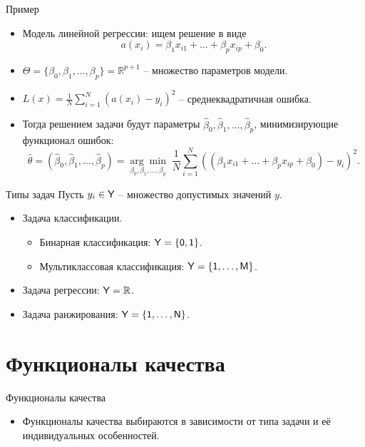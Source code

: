 \documentclass[9pt]{beamer}
\begin{document}
\begin{frame}{Пример}
\begin{itemize}
    \item Модель линейной регрессии: ищем решение в виде
    $$a(x_i) = \beta_1 x_{i1} + \ldots + \beta_p {x_{ip}} + \beta_0.$$
    \item $\Theta = \{\beta_0, \beta_1, \ldots, \beta_p\} = \mathbb{R}^{p+1}$ -- множество параметров модели.
    \item $L(x) = \frac{1}{N}\sum\limits_{i=1}^N(a(x_i) - y_i)^2$ -- среднеквадратичная ошибка.
    \item Тогда решением задачи будут параметры $\hat\beta_0, \hat\beta_1, \ldots, \hat\beta_p$, минимизирующие функционал ошибок:
    $$\hat\theta = (\hat\beta_0, \hat\beta_1, \ldots, \hat\beta_p) = \underset{\beta_0, \beta_1,\ldots, \beta_p}{\arg\min}\;  \frac{1}{N}\sum\limits_{i=1}^N( (\beta_1 x_{i1}  + \ldots + \beta_p x_{ip} + \beta_0) - y_i)^2.$$
\end{itemize}
\end{frame}


\begin{frame}{Типы задач}
Пусть $y_i \in \sf{Y}$ -- множество допустимых значений $y$.
\begin{itemize}
    \item Задача классификации.
    \begin{itemize}
        \item Бинарная классификация: $\sf{Y} = \{0, 1\}$.
        \item Мультиклассовая классификация: $\sf{Y} = \{1, \ldots, M\}$.
    \end{itemize}
    \item Задача регрессии: $\sf{Y} = \mathbb{R}$.
    \item Задача ранжирования: $\sf{Y} = \{1, \ldots, N\}$.
\end{itemize}
    
\end{frame}

\section{Функционалы качества}

\begin{frame}{Функционалы качества}
\begin{itemize}
    \item Функционалы качества выбираются в зависимости от типа задачи и её индивидуальных особенностей.
\end{itemize}
\end{frame}
\end{document}
